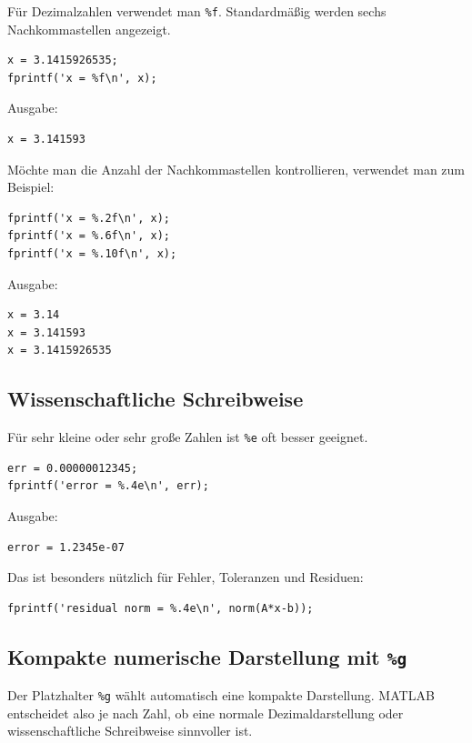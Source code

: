 \documentclass[10pt, letterpaper]{article}
\begin{document}
Für Dezimalzahlen verwendet man \texttt{\%f}. Standardmäßig werden sechs Nachkommastellen angezeigt.

\begin{verbatim}
x = 3.1415926535;
fprintf('x = %f\n', x);
\end{verbatim}

Ausgabe:

\begin{verbatim}
x = 3.141593
\end{verbatim}

Möchte man die Anzahl der Nachkommastellen kontrollieren, verwendet man zum Beispiel:

\begin{verbatim}
fprintf('x = %.2f\n', x);
fprintf('x = %.6f\n', x);
fprintf('x = %.10f\n', x);
\end{verbatim}

Ausgabe:

\begin{verbatim}
x = 3.14
x = 3.141593
x = 3.1415926535
\end{verbatim}

\subsection{Wissenschaftliche Schreibweise}

Für sehr kleine oder sehr große Zahlen ist \texttt{\%e} oft besser geeignet.

\begin{verbatim}
err = 0.00000012345;
fprintf('error = %.4e\n', err);
\end{verbatim}

Ausgabe:

\begin{verbatim}
error = 1.2345e-07
\end{verbatim}

Das ist besonders nützlich für Fehler, Toleranzen und Residuen:

\begin{verbatim}
fprintf('residual norm = %.4e\n', norm(A*x-b));
\end{verbatim}

\subsection{Kompakte numerische Darstellung mit \texttt{\%g}}

Der Platzhalter \texttt{\%g} wählt automatisch eine kompakte Darstellung. MATLAB entscheidet also je nach Zahl, ob eine normale Dezimaldarstellung oder wissenschaftliche Schreibweise sinnvoller ist.
\end{document}
